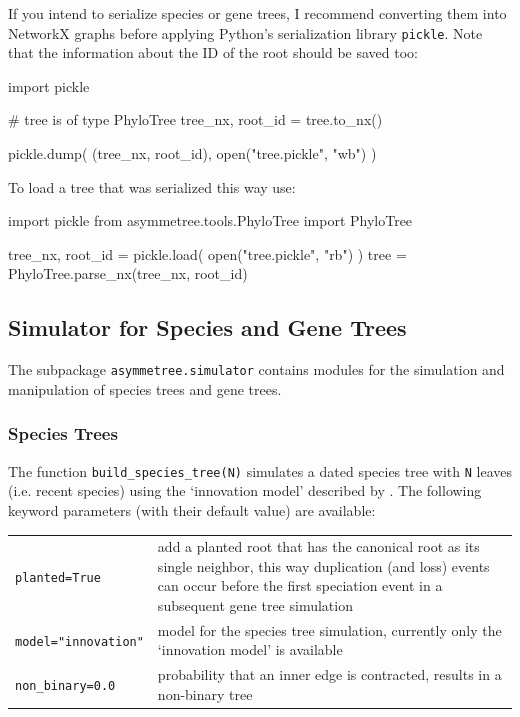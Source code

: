 \documentclass[hidelinks,11pt]{article}
\begin{document}
If you intend to serialize species or gene trees, I recommend converting them into NetworkX graphs before applying Python's serialization library \texttt{pickle}.
Note that the information about the ID of the root should be saved too:
\vspace{2mm}
\begin{python}
import pickle

# tree is of type PhyloTree
tree_nx, root_id = tree.to_nx()

pickle.dump( (tree_nx, root_id), open("tree.pickle", "wb") )
\end{python}
\vspace{2mm}
To load a tree that was serialized this way use:
\vspace{2mm}
\begin{python}
import pickle
from asymmetree.tools.PhyloTree import PhyloTree

tree_nx, root_id = pickle.load( open("tree.pickle", "rb") )
tree = PhyloTree.parse_nx(tree_nx, root_id)
\end{python}
\vspace{2mm}


\subsection{Simulator for Species and Gene Trees}

The subpackage \texttt{asymmetree.simulator} contains modules for the simulation and manipulation of species trees and gene trees.

\subsubsection{Species Trees}

The function \texttt{build\_species\_tree(N)} simulates a dated species tree with \texttt{N} leaves (i.e. recent species) using the `innovation model' described by \citet{keller-schmidt2012}.
The following keyword parameters (with their default value) are available:

\vspace{3mm}
\renewcommand{\arraystretch}{1.5}
\begin{tabularx}{0.95\textwidth} { >{\raggedright\arraybackslash}p{4cm} >{\raggedright\arraybackslash}X }
	\texttt{planted=True} & add a planted root that has the canonical root as its
	single neighbor, this way duplication (and loss) events can occur before the first speciation event in a subsequent gene tree simulation\\
	\texttt{model="innovation"}  & model for the species tree simulation, currently only the `innovation model' is available\\
	\texttt{non\_binary=0.0} & probability that an inner edge is contracted,
	results in a non-binary tree\\
\end{tabularx}
\vspace{3mm}
\end{document}
